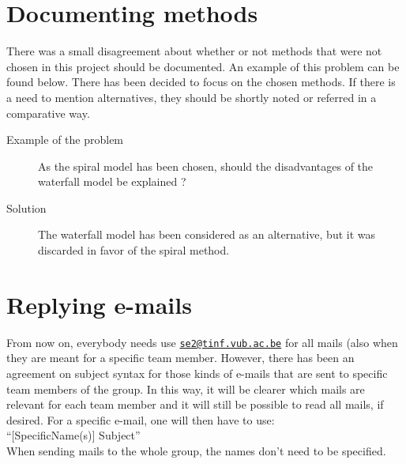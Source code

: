 \documentclass[a4paper, 12pt]{article}
\begin{document}
	\section{Documenting methods}
There was a small disagreement about whether or not methods that were not chosen in this project should be documented. An example of this problem can be found below. There has been decided to focus on the chosen methods. If there is a need to mention alternatives, they should be shortly noted or referred in a comparative way.
	\begin{description}
		\item [Example of the problem] As the spiral model has been chosen, should the disadvantages of the waterfall model be explained ?
		\item [Solution] The waterfall model has been considered as an alternative, but it was discarded in favor of the spiral method.
	\end{description}
	
	\section{Replying e-mails}
From now on, everybody needs use \href{mailto:se2@tinf.vub.ac.be}{\nolinkurl{se2@tinf.vub.ac.be}} for all mails (also when they are meant for a specific team member. However, there has been an agreement on subject syntax for those kinds of e-mails that are sent to specific team members of the group. In this way, it will be clearer which mails are relevant for each team member and it will still be possible to read all mails, if desired.
For a specific e-mail, one will then have to use:\\
``[SpecificName(s)] Subject''\\
When sending mails to the whole group, the names don't need to be specified.
\end{document}
